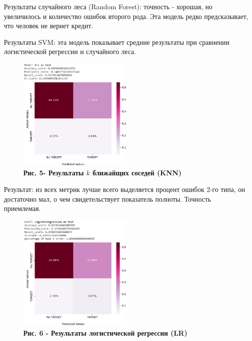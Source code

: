 \begin{multicols}{2}


	Результаты случайного леса (Random Forest): точность - хорошая, но
	увеличилось и количество ошибок второго рода. Эта модель редко
	предсказывает, что человек не вернет кредит.
	
	
	Результаты SVM: эта модель показывает средние результаты при сравнении
	логистической регрессии и случайного леса.
\end{multicols}








\begin{figure}[H]
	\centering
	\includegraphics[width=0.5\textwidth]{assets/123}
	\caption*{\bfseries Рис. 5- Результаты $k$ ближайщих соседей (KNN)}
\end{figure}

	
\begin{multicols}{2}
	
	Результат: из всех метрик лучше всего выделяется процент ошибок 2-го
	типа, он достаточно мал, о чем свидетельствует показатель полноты.
	Точность приемлемая.
\end{multicols}

\begin{figure}[H]
	\centering
	\includegraphics[width=0.5\textwidth]{assets/124}
	\caption*{\bfseries Рис. 6 - Результаты логистической регрессии (LR)}
\end{figure}






